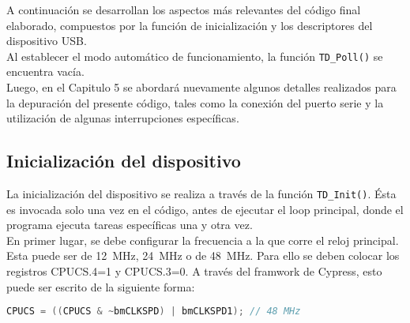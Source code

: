 A continuación se desarrollan los aspectos más relevantes del código final elaborado, compuestos por la función de inicialización y los descriptores del dispositivo USB.\\

Al establecer el modo automático de funcionamiento, la función \verb|TD_Poll()| se encuentra vacía.\\

Luego, en el Capitulo 5 se abordará nuevamente algunos detalles realizados para la depuración del presente código, tales como la conexión del puerto serie y la utilización de algunas interrupciones específicas.\\

\subsection{Inicialización del dispositivo}
	La inicialización del dispositivo se realiza a través de la función \verb|TD_Init()|. Ésta es invocada solo una vez en el código, antes de ejecutar el loop principal, donde el programa ejecuta tareas específicas una y otra vez.\\
	
	En primer lugar, se debe configurar la frecuencia a la que corre el reloj principal. Esta puede ser de \SI{12}{\mega\hertz}, \SI{24}{\mega\hertz} o de \SI{48}{\mega\hertz}. Para ello se deben colocar los registros CPUCS.4=1 y CPUCS.3=0. A través del framwork de Cypress, esto puede ser escrito de la siguiente forma:
	
	\begin{lstlisting}[language=C,backgroundcolor=\color{gray!30}]
	CPUCS = ((CPUCS & ~bmCLKSPD) | bmCLKSPD1); // 48 MHz
	\end{lstlisting}

